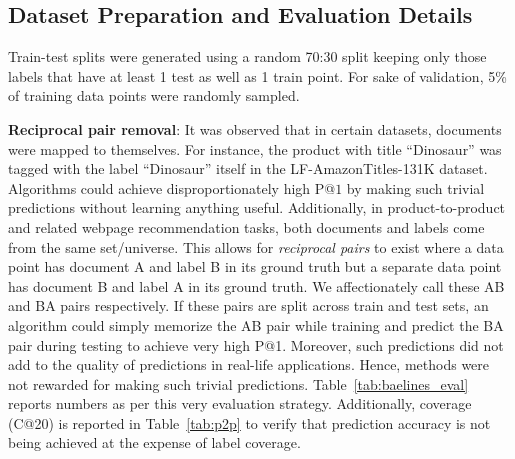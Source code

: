 \subsection{Dataset Preparation and Evaluation Details}
\label{app:dataprep}
Train-test splits were generated using a random 70:30 split keeping only those labels that have at least 1 test as well as 1 train point. For sake of validation, 5\% of training data points were randomly sampled.

\textbf{Reciprocal pair removal}:  It was observed that in certain datasets, documents were mapped to themselves. For instance, the product with title ``Dinosaur'' was tagged with the label ``Dinosaur'' itself in the LF-AmazonTitles-131K dataset. Algorithms could achieve disproportionately high P@$1$ by making such trivial predictions without learning anything useful. Additionally, in product-to-product and related webpage recommendation tasks, both documents and labels come from the same set/universe. This allows for \emph{reciprocal pairs} to exist where a data point has document A and label B in its ground truth but a separate data point has document B and label A in its ground truth. We affectionately call these AB and BA pairs respectively. If these pairs are split across train and test sets, an algorithm could simply memorize the AB pair while training and predict the BA pair during testing to achieve very high P@1. Moreover, such predictions did not add to the quality of predictions in real-life applications. Hence, methods were not rewarded for making such trivial predictions. Table~\ref{tab:baelines_eval} reports numbers as per this very evaluation strategy.
Additionally, coverage (C@20) is reported in Table~\ref{tab:p2p} to verify that prediction accuracy is not being achieved at the expense of label coverage.
